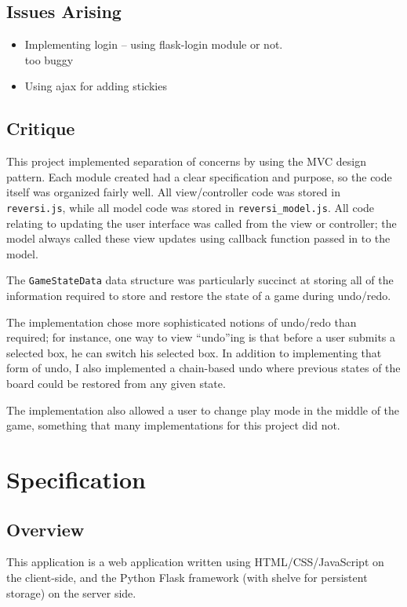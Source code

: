 \documentclass[11pt,letterpaper]{article}
\begin{document}
\subsection{Issues Arising}
\begin{itemize}
\item Implementing login -- using flask-login module or not. \\
too buggy
\item Using ajax for adding stickies
\end{itemize}

\subsection{Critique}
This project implemented separation of concerns by using the MVC design pattern. Each module created had a clear specification and purpose, so the code itself was organized fairly well. All view/controller code was stored in \texttt{reversi.js}, while all model code was stored in \texttt{reversi\_model.js}. All code relating to updating the user interface was called from the view or controller; the model always called these view updates using callback function passed in to the model.

The \texttt{GameStateData} data structure was particularly succinct at storing all of the information required to store and restore the state of a game during undo/redo.

The implementation chose more sophisticated notions of undo/redo than required; for instance, one way to view ``undo''ing is that before a user submits a selected box, he can switch his selected box. In addition to implementing that form of undo, I also implemented a chain-based undo where previous states of the board could be restored from any given state.

The implementation also allowed a user to change play mode in the middle of the game, something that many implementations for this project did not.
\section{Specification}
\subsection{Overview}
This application is a web application written using HTML/CSS/JavaScript on the client-side, and the Python Flask framework (with shelve for persistent storage) on the server side.
\end{document}

